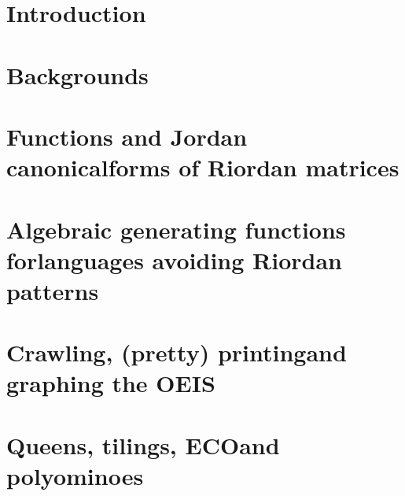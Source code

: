 \documentclass[a4paper]{tufte-book}
\begin{document}
\blankpage



\maketitle



\tableofcontents

\listoftables



\chapter*{Introduction}


\cleardoublepage

\chapter{Backgrounds}
\label{ch:backgrounds}



\chapter{Functions and Jordan canonical\newline forms of Riordan matrices}
\label{ch:Riordan-matrices-function}



\chapter{Algebraic generating functions for\newline languages avoiding Riordan patterns}
\label{ch:algebraic-gfs-languages-avoiding-Riordan-patterns}



\chapter{Crawling, (pretty) printing\newline and graphing the OEIS}
\label{ch:OEIS:tools}



\chapter{Queens, tilings, ECO\newline and polyominoes}
\label{ch:queens-tilings-polyominoes}
\end{document}
